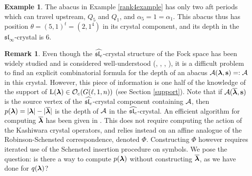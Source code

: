 \documentclass[12pt]{amsart}
\numberwithin{equation}{section}
\theoremstyle{definition}
\newtheorem{example}[equation]{Example}
\newtheorem{remark}[equation]{Remark}
\newcommand{\oh}{\mathcal{O}}
\newcommand{\el}{\mathrm{L}}
\newcommand{\slinf}{\mathfrak{sl}_\infty}
\newcommand{\mbs}{\mathbf{s}}
\begin{document}
\begin{example} The abacus in Example \ref{rank4example} has only two aft periods which can travel upstream, $Q_5$ and $Q_1$, and $\alpha_5=1=\alpha_1.$ This abacus thus has position $\theta=(5,1)^t=(2,1^4)$ in its crystal component, and its depth in the $\slinf$-crystal is $6$.
\end{example}

\begin{remark}\label{depthchapeau} 
Even though the $\widehat{\mathfrak{sl}_e}$-crystal structure of the Fock space has been widely studied and is considered well-understood
(\cite{JMMO1991}, \cite{FLOTW1999}, \cite{GeckJacon2011}, \cite{Gerber2015}),
it is a difficult problem to find an explicit combinatorial formula for the depth of an abacus $\cA(\bla,\mbs)=:\cA$ in this crystal.
However, this piece of information is one half of the knowledge of the support of $\el(\bla)\in\oh_c(G(\ell,1,n))$ (see Section \ref{support}). Note that if
$\cA(\overline{\bla},\mbs)$ is the source vertex of the $\widehat{\mathfrak{sl}_e}$-crystal component containing $\mathcal{A}$, then $ p(\boldsymbol{\lambda}) = |\boldsymbol{\lambda}|-|\overline{\boldsymbol{\lambda}}|$ is the depth of $\mathcal{A}$ in the $\widehat{\mathfrak{sl}_e}$-crystal. An efficient algorithm for computing $\overline{\boldsymbol{\lambda}}$ has been given in \cite[Theorem 6.3]{Gerber2015}. 
This does not require computing the action of the Kashiwara crystal operators,
and relies instead on an affine analogue of the Robinson-Schensted correspondence, denoted $\Phi$. 
Constructing $\Phi$ however requires iterated use of the Schensted insertion procedure on symbols.
We pose the question: is there a way to compute $p(\boldsymbol{\lambda})$ without constructing $\overline{\boldsymbol{\lambda}}$, as we have done for $q(\boldsymbol{\lambda})$?
\end{remark}
\end{document}
